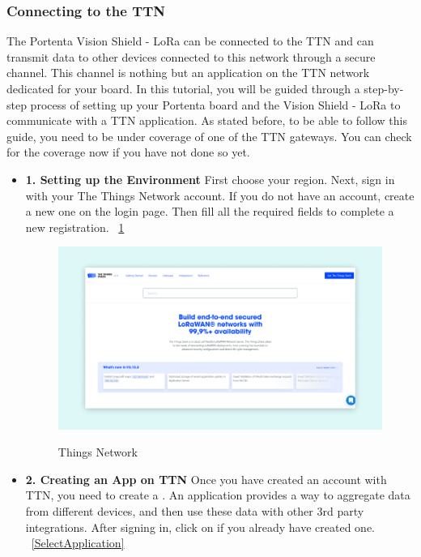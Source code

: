 	
\subsubsection{Connecting to the TTN}
The Portenta Vision Shield - LoRa can be connected to the TTN and can transmit data to other devices connected to this network through a secure channel. This channel is nothing but an application on the TTN network dedicated for your board. In this tutorial, you will be guided through a step-by-step process of setting up your Portenta board and the Vision Shield - LoRa to communicate with a TTN application. As stated before, to be able to follow this guide, you need to be under coverage of one of the TTN gateways. You can check for the coverage now if you have not done so yet.
\begin{itemize}
	
	\item \textbf{1. Setting up the Environment} First choose your region. Next, sign in with your The Things Network account. If you do not have an account, create a new one on the login page. Then fill all the required fields to complete a new registration. ~\ref{Things Network} \cite{connecting_to_ttn_portenta_vision_shield:2024}
	
	\begin{figure}
		\begin{center}
			\includegraphics[width=0.7\linewidth]{Images/LORA/ThingsNetwork.png}
			\caption{Things Network}
			\label{Things Network}\cite{connecting_to_ttn_portenta_vision_shield:2024}
		\end{center}
	\end{figure}
	
	\item \textbf{2. Creating an App on TTN} Once you have created an account with TTN, you need to create a . An application provides a way to aggregate data from different devices, and then use these data with other 3rd party integrations. After signing in, click on  if you already have created one. ~\ref{SelectApplication} \cite{connecting_to_ttn_portenta_vision_shield:2024}
	

\end{itemize}
